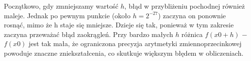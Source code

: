 \documentclass{article}
\begin{document}
Początkowo, gdy zmniejszamy wartość $h$, błąd w przybliżeniu pochodnej również maleje. Jednak po pewnym punkcie (około $h = 2^{-27}$) zaczyna on ponownie rosnąć, mimo że h staje się mniejsze. Dzieje się tak, ponieważ w tym zakresie zaczyna przeważać błąd zaokrągleń. Przy bardzo małych $h$ różnica $f(x0+h)$ $-$ $f(x0)$ jest tak mała, że ograniczona precyzja arytmetyki zmiennoprzecinkowej powoduje znaczne zniekształcenia, co skutkuje większym błędem w obliczeniach.
\end{document}
